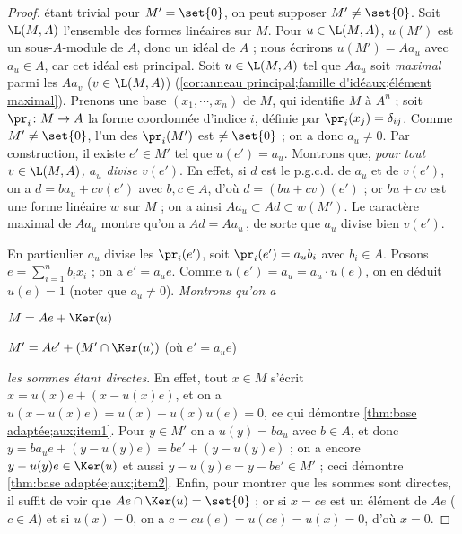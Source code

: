 \documentclass[11pt, useosf,
  title in boldface,
  theorem in new line,
  theorem numbering = section,
  number theorems separately,
]{simplivre}
\begin{document}
    \begin{proof}
         étant trivial pour \( M' = \set{0} \), on peut supposer \( M' \neq \set{0} \). Soit \( \L(M,A) \) l'ensemble des formes linéaires sur \( M \). Pour \( u \in \L(M,A) \), \( u(M') \) est un sous-\( A \)‑module de \( A \), donc un idéal de \( A \) ; nous écrirons \( u(M') = A a_u \) avec \( a_u \in A \), car cet idéal est principal. Soit \( u \in \L(M,A) \) tel que \( A a_u \) soit \emph{maximal} parmi les \( A a_v \) (\( v \in \L(M,A) \)) (\cref{cor:anneau principal;famille d'idéaux;élément maximal}). Prenons une base \( (x_1, \cdots, x_n) \) de \( M \), qui identifie \( M \) à \( A^n \) ; soit \( \pr_i \colon M \to A \) la forme coordonnée d'indice \( i \), définie par \( \pr_i(x_j) = \delta_{ij} \). Comme \( M' \neq \set{0} \), l'un des \( \pr_i(M') \) est \( \neq \set{0} \) ; on a donc \( a_u \neq 0 \). Par construction, il existe \( e' \in M' \) tel que \( u(e') = a_u \). Montrons que, \emph{pour tout \( v \in \L(M,A) \), \( a_u \) divise \( v(e') \)}. En effet, si \( d \) est le p.g.c.d. de \( a_u \) et de \( v(e') \), on a \( d = b a_u + c v(e') \) avec \( b,c \in A \), d'où \( d  = (bu+cv)(e') \) ; or \( bu + cv \) est une forme linéaire \( w \) sur \( M \) ; on a ainsi \( A a_u \subset Ad \subset w(M') \). Le caractère maximal de \( A a_u \) montre qu'on a \( Ad = A a_u \)\,, de sorte que \( a_u \) divise bien \( v(e') \).

        En particulier \( a_u \) divise les \( \pr_i(e') \), soit \( \pr_i(e') = a_u b_i \) avec \( b_i \in A \). Posons \( e = \sum_{i=1}^n b_i x_i \) ; on a \( e' = a_u e \). Comme \( u(e') = a_u = a_u \cdot u(e) \), on en déduit \( u(e) = 1 \) (noter que \( a_u \neq 0 \)). \emph{Montrons qu'on a}
        \begin{enumerate-roman}
            \item \label{thm:base adaptée;aux;item1} \( M = Ae + \Ker(u) \)
            \item \label{thm:base adaptée;aux;item2} \( M' = Ae' + (M' \cap \Ker(u)) \) \quad (où \( e' = a_u e \))
        \end{enumerate-roman}
        \emph{les sommes étant directes}. En effet, tout \( x \in M \) s'écrit \( x = u(x) e + (x-u(x)e) \), et on a \( u(x-u(x)e) = u(x) - u(x)u(e) = 0 \), ce qui démontre \ref{thm:base adaptée;aux;item1}. Pour \( y \in M' \) on a \( u(y) = b a_u \) avec \( b \in A \), et donc \( y = b a_u e + (y-u(y)e) = b e' + (y-u(y)e) \) ; on a encore \( y - u(y)e \in \Ker(u) \) et aussi \( y - u(y)e = y - b e' \in M' \) ; ceci démontre \ref{thm:base adaptée;aux;item2}. Enfin, pour montrer que les sommes sont directes, il suffit de voir que \( Ae \cap \Ker(u) = \set{0} \) ; or si \( x = ce \) est un élément de \( Ae \) (\( c \in A \)) et si \( u(x) = 0 \), on a \( c = c u(e) = u(ce) = u(x) = 0 \), d'où \( x = 0 \).


\end{proof}
\end{document}
